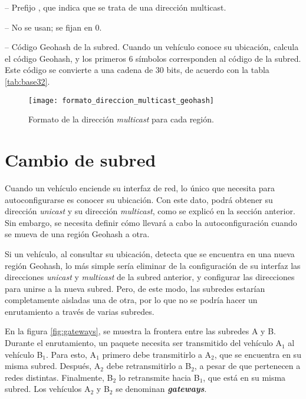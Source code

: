  -- Prefijo , que indica que se trata
de una dirección multicast.

 -- No se usan; se fijan en 0.

 -- Código Geohash de la subred. Cuando un vehículo
conoce su ubicación, calcula el código Geohash, y los primeros 6 símbolos
corresponden al código de la subred. Este código se convierte a una cadena de
30 bits, de acuerdo con la tabla \ref{tab:base32}.

\begin{figure}[th!]
\centering
\texttt{[image: formato\_direccion\_multicast\_geohash]}
\decoRule
\caption[Formato de la dirección \textit{multicast} para cada región]{Formato de
la dirección \textit{multicast} para cada región.}
\label{fig:formato_direccion_multicast_geohash}
\end{figure}

\section{Cambio de subred}

\label{sec:cambio_subred}

Cuando un vehículo enciende su interfaz de red, lo único que necesita para
autoconfigurarse es conocer su ubicación. Con este dato, podrá obtener su
dirección \textit{unicast} y su dirección \textit{multicast}, como se explicó
en la sección anterior. Sin embargo, se necesita definir cómo llevará a cabo la
autoconfiguración cuando se mueva de una región Geohash a otra.

Si un vehículo, al consultar su ubicación, detecta que se encuentra en una nueva
región Geohash, lo más simple sería eliminar de la configuración de su interfaz
las direcciones \textit{unicast} y \textit{multicast} de la subred anterior, y
configurar las direcciones para unirse a la nueva subred. Pero, de este modo,
las subredes estarían completamente aisladas una de otra, por lo que no se
podría hacer un enrutamiento a través de varias subredes.

En la figura \ref{fig:gateways}, se muestra la frontera entre las subredes
A y B. Durante el enrutamiento, un paquete necesita ser transmitido del vehículo
A$_1$ al vehículo B$_1$. Para esto, A$_1$ primero debe transmitirlo a A$_2$,
que se encuentra en su misma subred. Después, A$_2$ debe retransmitirlo a B$_2$,
a pesar de que pertenecen a redes distintas. Finalmente, B$_2$ lo retransmite
hacia B$_1$, que está en su misma subred. Los vehículos A$_2$ y B$_2$ se
denominan \textbf{\textit{gateways}}.

